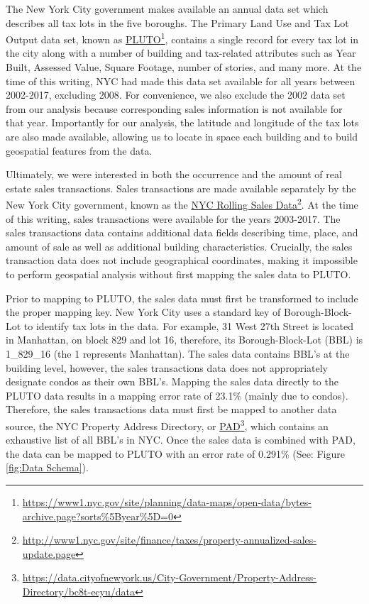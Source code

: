 \documentclass[12pt,]{article}
\let\rmarkdownfootnote\footnote%
\def\footnote{\protect\rmarkdownfootnote}
\begin{document}
The New York City government makes available an annual data set which
describes all tax lots in the five boroughs. The Primary Land Use and
Tax Lot Output data set, known as
\href{https://www1.nyc.gov/site/planning/data-maps/open-data/bytes-archive.page?sorts\%5Byear\%5D=0}{PLUTO}\footnote{\url{https://www1.nyc.gov/site/planning/data-maps/open-data/bytes-archive.page?sorts\%5Byear\%5D=0}},
contains a single record for every tax lot in the city along with a
number of building and tax-related attributes such as Year Built,
Assessed Value, Square Footage, number of stories, and many more. At the
time of this writing, NYC had made this data set available for all years
between 2002-2017, excluding 2008. For convenience, we also exclude the
2002 data set from our analysis because corresponding sales information
is not available for that year. Importantly for our analysis, the
latitude and longitude of the tax lots are also made available, allowing
us to locate in space each building and to build geospatial features
from the data.

Ultimately, we were interested in both the occurrence and the amount of
real estate sales transactions. Sales transactions are made available
separately by the New York City government, known as the
\href{http://www1.nyc.gov/site/finance/taxes/property-annualized-sales-update.page}{NYC
Rolling Sales Data}\footnote{\url{http://www1.nyc.gov/site/finance/taxes/property-annualized-sales-update.page}}.
At the time of this writing, sales transactions were available for the
years 2003-2017. The sales transactions data contains additional data
fields describing time, place, and amount of sale as well as additional
building characteristics. Crucially, the sales transaction data does not
include geographical coordinates, making it impossible to perform
geospatial analysis without first mapping the sales data to PLUTO.

Prior to mapping to PLUTO, the sales data must first be transformed to
include the proper mapping key. New York City uses a standard key of
Borough-Block-Lot to identify tax lots in the data. For example, 31 West
27th Street is located in Manhattan, on block 829 and lot 16, therefore,
its Borough-Block-Lot (BBL) is 1\_829\_16 (the 1 represents Manhattan).
The sales data contains BBL's at the building level, however, the sales
transactions data does not appropriately designate condos as their own
BBL's. Mapping the sales data directly to the PLUTO data results in a
mapping error rate of 23.1\% (mainly due to condos). Therefore, the
sales transactions data must first be mapped to another data source, the
NYC Property Address Directory, or
\href{https://data.cityofnewyork.us/City-Government/Property-Address-Directory/bc8t-ecyu/data}{PAD}\footnote{\url{https://data.cityofnewyork.us/City-Government/Property-Address-Directory/bc8t-ecyu/data}},
which contains an exhaustive list of all BBL's in NYC. Once the sales
data is combined with PAD, the data can be mapped to PLUTO with an error
rate of 0.291\% (See: Figure \ref{fig:Data Schema}).
\end{document}
